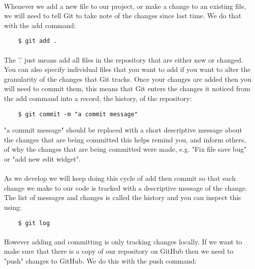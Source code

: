 \documentclass[10pt, a4paper]{article}
\begin{document}
\paragraph{} Whenever we add a new file to our project, or make a change to an existing file, we will need to tell Git to take note of the changes since last time. We do that with the add command:

\begin{lstlisting}
    $ git add .
\end{lstlisting}

\paragraph{} The '.' just means add all files in the repository that are either new or changed. You can also specify individual files that you want to add if you want to alter the granularity of the changes that Git tracks. Once your changes are added then you will need to commit them, this means that Git enters the changes it noticed from the add command into a record, the history, of the repository:

\begin{lstlisting}
    $ git commit -m "a commit message"
\end{lstlisting}

"a commit message" should be replaced with a short descriptive message about the changes that are being committed this helps remind you, and inform others, of why the changes that are being committed were made, e.g. "Fix file save bug" or "add new edit widget".

\paragraph{} As we develop we will keep doing this cycle of add then commit so that each change we make to our code is tracked with a descriptive message of the change. The list of messages and changes is called the history and you can inspect this using:
    
\begin{lstlisting}
    $ git log
\end{lstlisting}

\paragraph{} However adding and committing is only tracking changes locally. If we want to make sure that there is a copy of our repository on GitHub then we need to "push" changes to GitHub. We do this with the push command:
\end{document}

